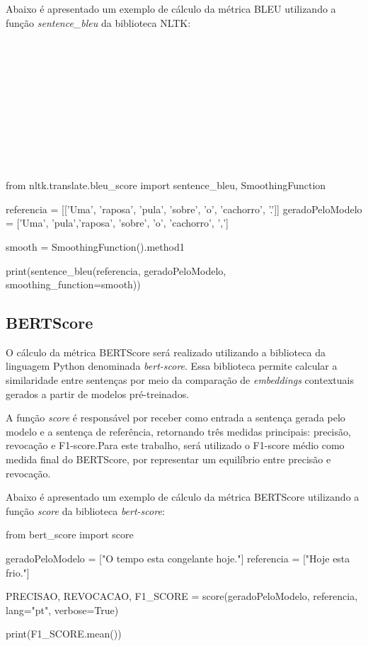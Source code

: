 Abaixo é apresentado um exemplo de cálculo da métrica BLEU utilizando a função \textit{sentence\_bleu} da biblioteca NLTK:
\\
\\
\\
\\
\\
\\
\\
\\
\\
\\
\\
\begin{listing}
\begin{python}
from nltk.translate.bleu_score import sentence_bleu, SmoothingFunction

referencia = [['Uma', 'raposa', 'pula', 'sobre', 'o', 'cachorro', '.']]
geradoPeloModelo = ['Uma', 'pula','raposa', 'sobre', 'o', 'cachorro', ',']

smooth = SmoothingFunction().method1

print(sentence_bleu(referencia, geradoPeloModelo, smoothing_function=smooth))
\end{python}
\caption{Exemplo de cálculo da métrica BLEU com NLTK}
\label{code:bleu_example}
\end{listing}

\subsection{BERTScore}

O cálculo da métrica BERTScore será realizado utilizando a biblioteca da linguagem Python denominada \textit{bert-score}. Essa biblioteca permite calcular a similaridade entre sentenças por meio da comparação de \textit{embeddings} contextuais gerados a partir de modelos pré-treinados.

A função \textit{score} é responsável por receber como entrada a sentença gerada pelo modelo e a sentença de referência, retornando três medidas principais: precisão, revocação e F1-score.Para este trabalho, será utilizado o F1-score médio como medida final do BERTScore, por representar um equilíbrio entre precisão e revocação.

Abaixo é apresentado um exemplo de cálculo da métrica BERTScore utilizando a função \textit{score} da biblioteca \textit{bert-score}:

\begin{listing}
\begin{python}
from bert_score import score

geradoPeloModelo = ["O tempo esta congelante hoje."]
referencia = ["Hoje esta frio."]

PRECISAO, REVOCACAO, F1_SCORE = score(geradoPeloModelo, referencia, lang="pt", verbose=True)

print(F1_SCORE.mean())

\end{python}
\caption{Exemplo de cálculo da métrica BERTScore com a biblioteca bert-score}
\label{code:bleu_example}
\end{listing}

